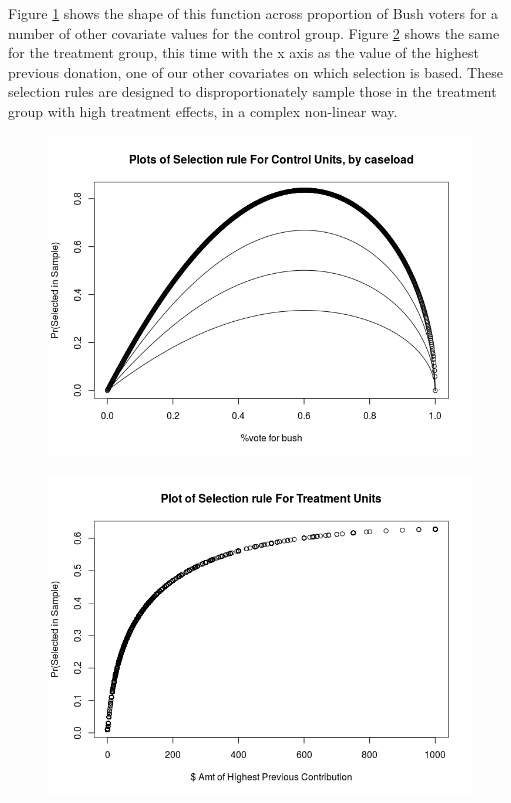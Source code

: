 \documentclass[paper=letter, fontsize=11pt]{scrartcl} %
\begin{document}
Figure \ref{select_c} shows the shape of this function across proportion of Bush voters for a number of other covariate values for the control group. Figure \ref{select_t} shows the same for the treatment group, this time with the x axis as the value of the highest previous donation, one of our other covariates on which selection is based. These selection rules are designed to disproportionately sample those in the treatment group with high treatment effects, in a complex non-linear way.

\begin{figure}[!ht]
\center
\caption{  \label{select_c}}
\includegraphics[scale=0.8]{select_c.png}
\end{figure}

\begin{figure}[!ht]
\center
\caption{  \label{select_t}}
\includegraphics[scale=0.8]{select_t.png}
\end{figure}
\end{document}
